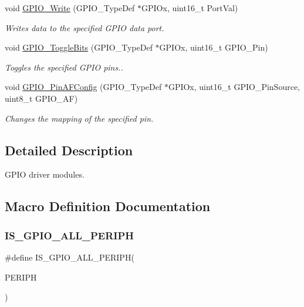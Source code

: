 \begin{DoxyCompactItemize}
void \mbox{\hyperlink{group___g_p_i_o_gaa925f19c8547a00c7a0c269a84873bf9}{G\+P\+I\+O\+\_\+\+Write}} (G\+P\+I\+O\+\_\+\+Type\+Def $\ast$G\+P\+I\+Ox, uint16\+\_\+t Port\+Val)
\begin{DoxyCompactList}\small\item\em Writes data to the specified G\+P\+IO data port. \end{DoxyCompactList}\item 
void \mbox{\hyperlink{group___g_p_i_o_gac1b837c66258872740d5f89f23549ab1}{G\+P\+I\+O\+\_\+\+Toggle\+Bits}} (G\+P\+I\+O\+\_\+\+Type\+Def $\ast$G\+P\+I\+Ox, uint16\+\_\+t G\+P\+I\+O\+\_\+\+Pin)
\begin{DoxyCompactList}\small\item\em Toggles the specified G\+P\+IO pins.. \end{DoxyCompactList}\item 
void \mbox{\hyperlink{group___g_p_i_o_ga0a77617a322562ae84f8d72486032c5d}{G\+P\+I\+O\+\_\+\+Pin\+A\+F\+Config}} (G\+P\+I\+O\+\_\+\+Type\+Def $\ast$G\+P\+I\+Ox, uint16\+\_\+t G\+P\+I\+O\+\_\+\+Pin\+Source, uint8\+\_\+t G\+P\+I\+O\+\_\+\+AF)
\begin{DoxyCompactList}\small\item\em Changes the mapping of the specified pin. \end{DoxyCompactList}\end{DoxyCompactItemize}


\subsection{Detailed Description}
G\+P\+IO driver modules. 



\subsection{Macro Definition Documentation}
\mbox{\label{group___g_p_i_o_ga68b2a1f0b05c13978217db5439c7f790}} 
\subsubsection{\texorpdfstring{I\+S\+\_\+\+G\+P\+I\+O\+\_\+\+A\+L\+L\+\_\+\+P\+E\+R\+I\+PH}{IS\_GPIO\_ALL\_PERIPH}}
{\footnotesize\ttfamily \#define I\+S\+\_\+\+G\+P\+I\+O\+\_\+\+A\+L\+L\+\_\+\+P\+E\+R\+I\+PH(\begin{DoxyParamCaption}\item[{}]{P\+E\+R\+I\+PH }\end{DoxyParamCaption})}

